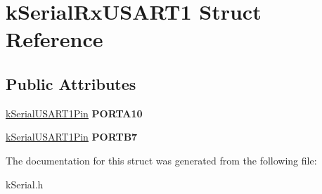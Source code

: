 \hypertarget{structkSerialRxUSART1}{}\section{k\+Serial\+Rx\+U\+S\+A\+R\+T1 Struct Reference}
\label{structkSerialRxUSART1}
\subsection*{Public Attributes}
\begin{DoxyCompactItemize}
\item 
\hyperlink{structkSerialUSART1Pin}{k\+Serial\+U\+S\+A\+R\+T1\+Pin} {\bfseries P\+O\+R\+T\+A10}\hypertarget{structkSerialRxUSART1_a8f0a7315abf68688cb68c647c75fda2d}{}\label{structkSerialRxUSART1_a8f0a7315abf68688cb68c647c75fda2d}

\item 
\hyperlink{structkSerialUSART1Pin}{k\+Serial\+U\+S\+A\+R\+T1\+Pin} {\bfseries P\+O\+R\+T\+B7}\hypertarget{structkSerialRxUSART1_ac04db3cc8160e013396b2bd53c4f2b5c}{}\label{structkSerialRxUSART1_ac04db3cc8160e013396b2bd53c4f2b5c}

\end{DoxyCompactItemize}


The documentation for this struct was generated from the following file\+:\begin{DoxyCompactItemize}
\item 
k\+Serial.\+h\end{DoxyCompactItemize}
